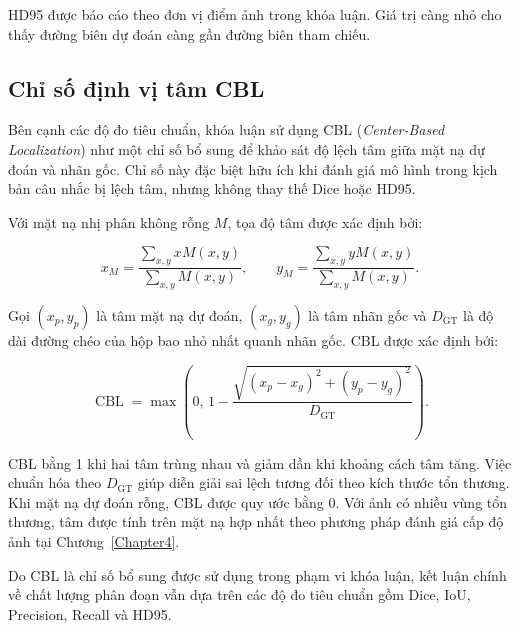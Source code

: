 HD95 được báo cáo theo đơn vị điểm ảnh trong khóa luận. Giá trị càng nhỏ cho thấy đường biên dự đoán càng gần đường biên tham chiếu.

\subsection{Chỉ số định vị tâm CBL}
\label{subsec:cbl}

Bên cạnh các độ đo tiêu chuẩn, khóa luận sử dụng CBL (\textit{Center-Based Localization}) như một chỉ số bổ sung để khảo sát độ lệch tâm giữa mặt nạ dự đoán và nhãn gốc. Chỉ số này đặc biệt hữu ích khi đánh giá mô hình trong kịch bản câu nhắc bị lệch tâm, nhưng không thay thế Dice hoặc HD95.

Với mặt nạ nhị phân không rỗng $M$, tọa độ tâm được xác định bởi:

\begin{equation}
    x_M
    =
    \frac{
        \sum_{x,y}xM(x,y)
    }{
        \sum_{x,y}M(x,y)
    },
    \qquad
    y_M
    =
    \frac{
        \sum_{x,y}yM(x,y)
    }{
        \sum_{x,y}M(x,y)
    }.
    \label{eq:mask_centroid}
\end{equation}

Gọi $(x_p,y_p)$ là tâm mặt nạ dự đoán,
$(x_g,y_g)$ là tâm nhãn gốc và $D_{\mathrm{GT}}$ là độ dài đường chéo của hộp bao nhỏ nhất quanh nhãn gốc. CBL được xác định bởi:

\begin{equation}
    \operatorname{CBL}
    =
    \max
    \left(
        0,\,
        1-
        \frac{
            \sqrt{
                (x_p-x_g)^2+
                (y_p-y_g)^2
            }
        }{
            D_{\mathrm{GT}}
        }
    \right).
    \label{eq:cbl}
\end{equation}

CBL bằng 1 khi hai tâm trùng nhau và giảm dần khi khoảng cách tâm tăng. Việc chuẩn hóa theo $D_{\mathrm{GT}}$ giúp diễn giải sai lệch tương đối theo kích thước tổn thương. Khi mặt nạ dự đoán rỗng, CBL được quy ước bằng 0. Với ảnh có nhiều vùng tổn thương, tâm được tính trên mặt nạ hợp nhất theo phương pháp đánh giá cấp độ ảnh tại Chương~\ref{Chapter4}.

Do CBL là chỉ số bổ sung được sử dụng trong phạm vi khóa luận, kết luận chính về chất lượng phân đoạn vẫn dựa trên các độ đo tiêu chuẩn gồm Dice, IoU, Precision, Recall và HD95.

